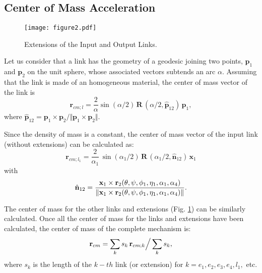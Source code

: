\documentclass[11pt]{article}
\providecommand{\norm}[1]{\lVert #1\rVert }
\begin{document}
\subsection{Center of Mass Acceleration}
\begin{figure}[htb]
\begin{center}
\texttt{[image: figure2.pdf]} 
\caption{Extensions of the Input and Output Links.}
\label{figure2}
\end{center}
\end{figure}
Let us consider that a link has the geometry of a geodesic joining two 
points, $\mathbf{p}_1$ and $\mathbf{p}_2$ on the unit sphere, whose 
associated vectors subtends an arc $\alpha$. Assuming that the link is 
made of an homogeneous material, the center of mass vector of the link 
is
\begin{equation}
 \mathbf{r}_{cm;l}=\frac{2}{\alpha} \sin(\alpha/2) \,\mathbf{R}\,
 (\alpha /2, \hat{\mathbf{p}}_{12} )\,\mathbf{p}_1 ,
\end{equation}
where $ \hat{\mathbf{p}}_{12} =\mathbf{p}_1 \times \mathbf{p}_2/\Vert 
\mathbf{p}_1 \times \mathbf{p}_2  \Vert$.

Since the density of mass is a constant, the center of mass vector of 
the input link (without extensions) can be calculated as:
\begin{equation}
\mathbf{r}_{cm;l_1} = \frac{2}{\alpha_1}\,\sin(\alpha_1/2) \,
\mathbf{R}\,(\alpha_1 /2, \hat{\mathbf{n}}_{12} )\, \mathbf{x}_1 
\end{equation}
with 
\begin{equation}\label{n12}
\hat{\bf{n}}_{12}=\dfrac{\mathbf{x}_1 \times 
{\mathbf r}_2 (\theta,\psi,\phi_1,\eta_1,\alpha_1,\alpha_4)} 
{\norm{\mathbf{x}_1 \times {\mathbf r}_2(\theta,\psi,\phi_1,\eta_1,
\alpha_1,\alpha_4)}}.
\end{equation}

The center of mass for the other links and extensions (Fig. 
\ref{figure2}) can be similarly calculated. Once all the center of mass 
for the links and extensions have been calculated, the center of mass of 
the complete mechanism is:
\begin{equation}\label{rcmeq}
\mathbf{r}_{cm} = \sum _k s_k  \, \mathbf{r}_{cm;k}\Big{ /}\sum_ k s_k,
\end{equation}
where $s_k$ is the length of the $k-th$ link (or extension) for $k=e_1,
e_2,e_3,e_4,l_1,$ etc. 
\end{document}
